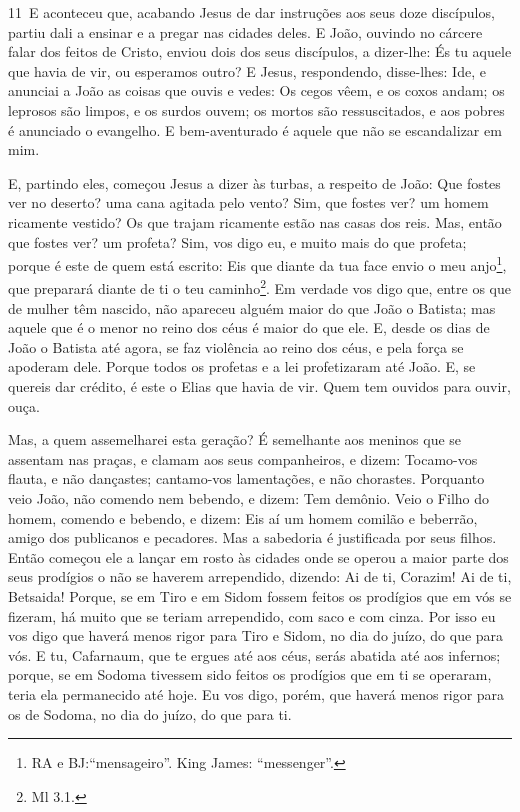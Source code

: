 \medskip

\lettrine{11}\ E aconteceu que, acabando Jesus de dar
instruções aos seus doze discípulos, partiu dali a ensinar e a
pregar nas cidades deles. E João, ouvindo no cárcere falar dos
feitos de Cristo, enviou dois dos seus discípulos, a dizer-lhe:
És tu aquele que havia de vir, ou esperamos outro? E Jesus,
respondendo, disse-lhes: Ide, e anunciai a João as coisas que ouvis
e vedes: Os cegos vêem, e os coxos andam; os leprosos são
limpos, e os surdos ouvem; os mortos são ressuscitados, e aos pobres
é anunciado o evangelho. E bem-aventurado é aquele que não se
escandalizar em mim.

E, partindo eles, começou Jesus a dizer às turbas, a respeito de
João: Que fostes ver no deserto? uma cana agitada pelo vento?
Sim, que fostes ver? um homem ricamente vestido? Os que trajam
ricamente estão nas casas dos reis. Mas, então que fostes ver?
um profeta? Sim, vos digo eu, e muito mais do que profeta;
porque é este de quem está escrito: Eis que diante da tua
face envio o meu anjo\footnote{RA e BJ:``mensageiro''. King James:
``messenger''.}, que preparará diante de ti o teu
caminho\footnote{Ml 3.1.}. Em verdade vos digo que, entre os
que de mulher têm nascido, não apareceu alguém maior do que João o
Batista; mas aquele que é o menor no reino dos céus é maior do que
ele. E, desde os dias de João o Batista até agora, se faz
violência ao reino dos céus, e pela força se apoderam dele.
Porque todos os profetas e a lei profetizaram até João.
E, se quereis dar crédito, é este o Elias que havia de vir.
Quem tem ouvidos para ouvir, ouça.

Mas, a quem assemelharei esta geração? É semelhante aos meninos
que se assentam nas praças, e clamam aos seus companheiros, e
dizem: Tocamo-vos flauta, e não dançastes; cantamo-vos lamentações,
e não chorastes. Porquanto veio João, não comendo nem
bebendo, e dizem: Tem demônio. Veio o Filho do homem, comendo
e bebendo, e dizem: Eis aí um homem comilão e beberrão, amigo dos
publicanos e pecadores. Mas a sabedoria é justificada por seus
filhos. Então começou ele a lançar em rosto às cidades onde
se operou a maior parte dos seus prodígios o não se haverem
arrependido, dizendo: Ai de ti, Corazim! Ai de ti, Betsaida!
Porque, se em Tiro e em Sidom fossem feitos os prodígios que em vós
se fizeram, há muito que se teriam arrependido, com saco e com
cinza. Por isso eu vos digo que haverá menos rigor para Tiro
e Sidom, no dia do juízo, do que para vós. E tu, Cafarnaum,
que te ergues até aos céus, serás abatida até aos infernos; porque,
se em Sodoma tivessem sido feitos os prodígios que em ti se
operaram, teria ela permanecido até hoje. Eu vos digo, porém,
que haverá menos rigor para os de Sodoma, no dia do juízo, do que
para ti.

